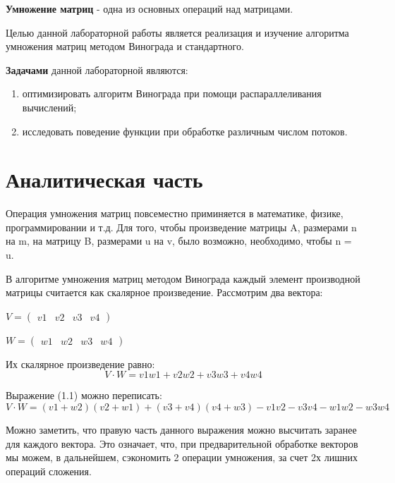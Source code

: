 \documentclass[12pt]{report}
\begin{document}
	\textbf{Умножение матриц} - одна из основных операций над матрицами.
	
	Целью данной лабораторной работы является реализация и изучение алгоритма умножения матриц методом Винограда и стандартного.
	
	\textbf{Задачами} данной лабораторной являются:
	\begin{enumerate}
		\item оптимизировать алгоритм Винограда при помощи распараллеливания вычислений;
		\item исследовать поведение функции при обработке различным числом потоков. 
	\end{enumerate}
	
	\chapter{Аналитическая часть}
	Операция умножения матриц повсеместно приминяется в математике, физике, программировании и т.д.
	Для того, чтобы произведение матрицы A, размерами n на m, на матрицу B, размерами u на v, было возможно, необходимо, чтобы n = u.
	
	В алгоритме умножения матриц методом Винограда \cite{1} каждый элемент производной матрицы считается как скалярное произведение.
	Рассмотрим два вектора:
	\begin{center}
		{$
			V = 
			\begin{pmatrix}
			v1 & v2 & v3 & v4
			\end{pmatrix}
			$}
		
		{$
			W = 
			\begin{pmatrix}
			w1 & w2 & w3 & w4
			\end{pmatrix}
			$}
	\end{center}
	
	Их скалярное произведение равно:
	\begin{equation}
	V\cdot W = v1w1 + v2w2 + v3w3 + v4w4
	\end{equation}
	
	Выражение (1.1) можно переписать:
	\begin{equation}
	V\cdot W = (v1 + w2)(v2 + w1) + (v3 + v4)(v4 + w3) - v1v2 - v3v4 - w1w2 - w3w4
	\end{equation}
	
	Можно заметить, что правую часть данного выражения можно высчитать заранее для каждого вектора.
	Это означает, что, при предварительной обработке векторов мы можем, в дальнейшем, сэкономить 2 операции умножения, за счет 2х лишних операций сложения.
	
\end{document}
